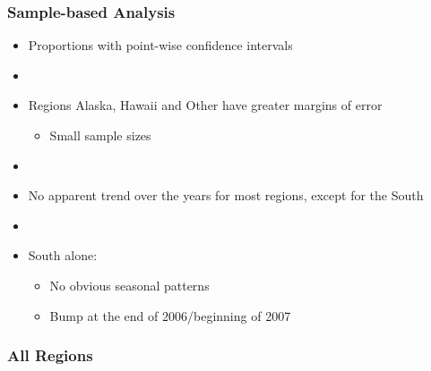 \documentclass{beamer}
\begin{document}
\begin{frame}
\frametitle{Sample-based Analysis}
\begin{itemize}
\item Proportions with point-wise confidence intervals

\item[]

\item Regions Alaska, Hawaii and Other have greater margins of error
\begin{itemize}
\item Small sample sizes
\end{itemize}

\item[]

\item No apparent trend over the years for most regions, except for the South

\item[]

\item South alone:
\begin{itemize}
\item No obvious seasonal patterns
\item Bump at the end of 2006/beginning of 2007
\end{itemize}

\end{itemize}
\end{frame}




\begin{frame}
\frametitle{All Regions}
\begin{center}
\end{center}
\end{frame}
\end{document}
